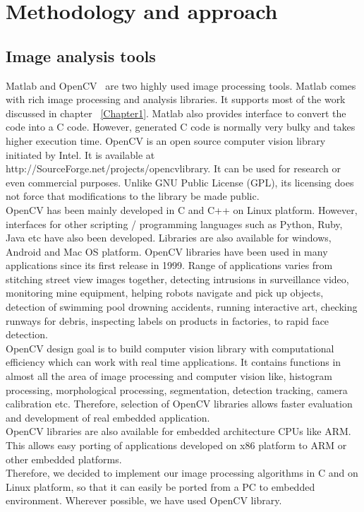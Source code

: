
\chapter{Methodology and approach} %
\label{Chapter2}

\section{Image analysis tools}
\indent Matlab and OpenCV~\cite{34} are two highly used image processing
tools.  Matlab comes with rich image processing and analysis libraries.
It supports most of the work discussed in chapter ~\ref{Chapter1}.
Matlab also provides interface to convert the code into a C code.
However, generated C code is normally very bulky and takes higher
execution time. OpenCV is an open source computer vision library
initiated by Intel. It is available at
http://SourceForge.net/projects/opencvlibrary. It can be used for
research or even commercial purposes. Unlike GNU Public License (GPL),
its licensing does not force that modifications to the library be made
public. \\
\indent OpenCV has been mainly developed in C and C++ on Linux platform.
However, interfaces for other scripting / programming languages such as
Python, Ruby, Java etc have also been developed. Libraries are also
available for windows, Android and Mac OS platform. OpenCV libraries
have been used in many applications since its first release in 1999.
Range of applications varies from stitching street view images together,
detecting intrusions in surveillance video, monitoring mine equipment,
helping robots navigate and pick up objects, detection of swimming pool
drowning accidents, running interactive art, checking runways for
debris, inspecting labels on products in factories, to rapid face
detection.\\
\indent OpenCV design goal is to build computer vision library with
computational efficiency which can work with real time applications. It
contains functions in almost all the area of image processing  and
computer vision like, histogram processing, morphological processing,
segmentation, detection tracking, camera calibration etc. Therefore,
selection of OpenCV libraries allows faster evaluation and development
of real embedded application.\\
\indent OpenCV libraries are also available for embedded architecture
CPUs like ARM. This allows easy porting of applications developed on x86
platform to ARM or other embedded platforms.\\
\indent Therefore, we decided to implement our image processing
algorithms in C and on Linux platform, so that it can easily be ported
from a PC to embedded environment. Wherever possible, we have used
OpenCV library.
